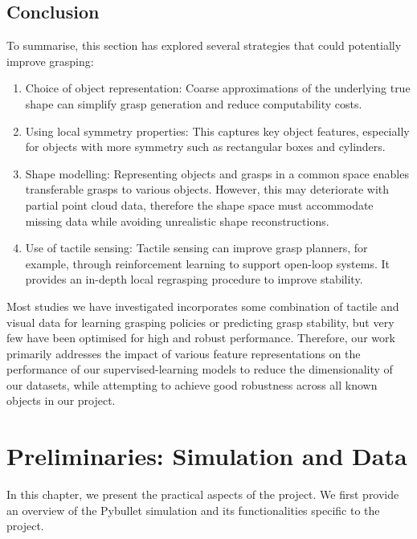 \documentclass[11pt, a4paper]{report}
\begin{document}
\section{Conclusion}
\label{sec:2.4}
To summarise, this section has explored several strategies that could potentially improve grasping:
\begin{enumerate}
    \item Choice of object representation: Coarse approximations of the underlying true shape can simplify grasp generation and reduce computability costs.
    \item Using local symmetry properties: This captures key object features, especially for objects with more symmetry such as rectangular boxes and cylinders.
    \item Shape modelling: Representing objects and grasps in a common space enables transferable grasps to various objects. However, this may deteriorate with partial point cloud data, therefore the shape space must accommodate missing data while avoiding unrealistic shape reconstructions.
    \item Use of tactile sensing: Tactile sensing can improve grasp planners, for example, through reinforcement learning to support open-loop systems. It provides an in-depth local regrasping procedure to improve stability.
\end{enumerate}
Most studies we have investigated incorporates some combination of tactile and visual data for learning grasping policies or predicting grasp stability, but very few have been optimised for high and robust performance. Therefore, our work primarily addresses the impact of various feature representations on the performance of our supervised-learning models to reduce the dimensionality of our datasets, while attempting to achieve good robustness across all known objects in our project. 



\chapter{Preliminaries: Simulation and Data}
\label{chap:3}
In this chapter, we present the practical aspects of the project. We first provide an overview of the Pybullet simulation and its functionalities specific to the project.
\end{document}
